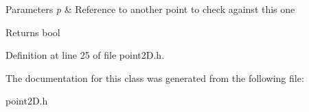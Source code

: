 \begin{DoxyParams}{Parameters}
{\em p} & Reference to another point to check against this one \\
\hline
\end{DoxyParams}
\begin{DoxyReturn}{Returns}
bool 
\end{DoxyReturn}


Definition at line 25 of file point2\+D.\+h.



The documentation for this class was generated from the following file\+:\begin{DoxyCompactItemize}
\item 
point2\+D.\+h\end{DoxyCompactItemize}
